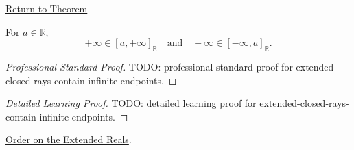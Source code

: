\newpage
{}
\label{prf:extended-closed-rays-contain-infinite-endpoints}
\begin{remark*}[Return]
\hyperref[thm:extended-closed-rays-contain-infinite-endpoints]{Return to Theorem}
\end{remark*}
\begin{theorem*}
For $a\in\mathbb{R}$,
\[
+\infty\in [a,+\infty]_{\overline{\mathbb{R}}}
\quad\text{and}\quad
-\infty\in [-\infty,a]_{\overline{\mathbb{R}}}.
\]
\end{theorem*}
\begin{proof}[Professional Standard Proof]
\LRAProofBodyStart
TODO: professional standard proof for extended-closed-rays-contain-infinite-endpoints.
\end{proof}
\begin{proof}[Detailed Learning Proof]
\LRAProofBodyStart
TODO: detailed learning proof for extended-closed-rays-contain-infinite-endpoints.
\end{proof}
\begin{remark*}
\end{remark*}
\begin{dependencies}
\hyperref[def:extended-real-order]{Order on the Extended Reals}.
\end{dependencies}
\clearpage

